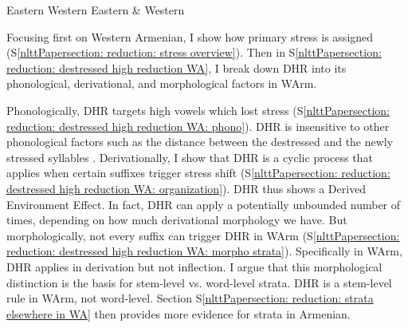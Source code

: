 \begin{exe}
	
	\ex 
	\begin{xlist}
		
		\ex {}\label{nlttPaperexample: warm earm reduce high list intro: base} 
		\ex {}\label{nlttPaperexample: warm earm reduce high list intro: der} 
		\ex \makebox[3cm][l]{}\label{nlttPaperexample: warm earm reduce high list intro: der unstress} 
		
		\ex {}Eastern\label{nlttPaperexample: warm earm reduce high list intro: V inf ea} 
		\ex \makebox[3cm][l]{}Western\label{nlttPaperexample: warm earm reduce high list intro: V inf wa} 
		\ex {}Eastern \& Western\label{nlttPaperexample: warm earm reduce high list intro: C inf both} 
	\end{xlist}\label{nlttPaperexample: warm earm reduce high list intro}
	
	
\end{exe}


Focusing first on Western Armenian, I show how primary stress is assigned (S\ref{nlttPapersection: reduction: stress overview}). Then in S\ref{nlttPapersection: reduction: destressed high reduction WA}, I break down DHR into its phonological, derivational, and morphological factors in WArm. 

Phonologically, DHR targets high vowels which lost stress (S\ref{nlttPapersection: reduction: destressed high reduction WA: phono}). DHR is insensitive to other phonological factors such as the distance between the destressed and the newly stressed syllables . Derivationally, I show that DHR is a cyclic process that applies when certain suffixes trigger stress shift (S\ref{nlttPapersection: reduction: destressed high reduction WA: organization}). DHR thus shows a Derived Environment Effect. In fact, DHR can apply a potentially unbounded number of times, depending on how much derivational morphology we have. But morphologically, not every suffix can trigger DHR in WArm (S\ref{nlttPapersection: reduction: destressed high reduction WA: morpho strata}). Specifically in WArm, DHR applies in derivation but not inflection.
I argue that this morphological distinction is the basis for stem-level vs. word-level strata. DHR is a {stem-level} rule in WArm, not word-level. Section S\ref{nlttPapersection: reduction: strata elsewhere in WA} then provides more evidence for strata in Armenian. 


